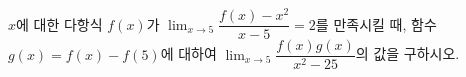 $x$에 대한 다항식 $f(x)$가 $\displaystyle\lim_{x\to5}\dfrac{f(x)-x^2}{x-5}=2$를 만족시킬 때, 함수 $g(x)=f(x)-f(5)$에 대하여 $\displaystyle\lim_{x\to5}\dfrac{f(x)g(x)}{x^2-25}$의 값을 구하시오.
